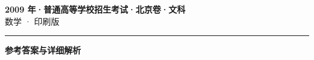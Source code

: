 \documentclass[zihao=5, a4paper]{ctexart}
\begin{document}
\begin{center}
  {\Large\bfseries 2009 年·普通高等学校招生考试·北京卷·文科}\\[4pt]
  {\large 数学 · 印刷版}
\end{center}
\medskip
{}

\par\bigskip\hrule\bigskip
{}
\begin{center}{\large\bfseries 参考答案与详细解析}\end{center}
\smallskip

\end{document}
